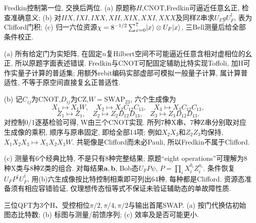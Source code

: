 \begin{exercise}Fredkin控制第一位, 交换后两位. (a) 原题称$H$,CNOT,Fredkin可逼近任意幺正, 检查准确意义; (b) 对$IIX,IXI,IXX,XII,XIX,XXI,XXX$及同样Z串求$U_FgU_F^\dagger$, 表为Clifford门积; (c) 归一六位资源$\chi=8^{-1/2}\sum_{x=0}^7\lvert x\rangle\otimes U_F\lvert x\rangle$, 三Bell测量后给全部条件校正.\end{exercise}
\begin{solution}(a) 所有给定门为实矩阵, 在固定$n$复Hilbert空间不可能逼近任意含相对虚相位的幺正, 所以原题字面表述错误. Fredkin与CNOT可配固定辅助比特实现Toffoli, 加H可作实量子计算的普适集; 用额外rebit编码实部虚部可模拟一般量子计算, 属计算普适性, 不等于原空间直接复幺正普适性.

(b) 记$C_{ij}$为CNOT,$D_{ij}$为CZ,$W=\mathrm{SWAP}_{23}$, 六个生成像为
\[X_1\mapsto X_1W,\quad X_2\mapsto X_2C_{12}C_{13},\quad X_3\mapsto X_3C_{12}C_{13},\]
\[Z_1\mapsto Z_1,\quad Z_2\mapsto Z_2D_{12}D_{13},\quad Z_3\mapsto Z_3D_{12}D_{13}.\]
对控制0/1逐基检验可得, W由三个CNOT实现. 所列7种X串、7种Z串分别取对应生成像的乘积, 顺序与原串固定, 即给全部14项; 例如$X_2X_3$和$Z_2Z_3$均保持, $X_1X_2X_3\mapsto X_1X_2X_3W$. 共轭像是Clifford而未必Pauli, 所以Fredkin不属于Clifford.

(c) 测量有6个经典比特, 不是只有8种完整结果; 原题“eight operations”可理解为8种X类与8种Z类的组合. 对每结果$\mathbf a,\mathbf b$, Bob态$U_FP\psi$, $P=\prod_iX_i^{b_i}Z_i^{a_i}$. 条件恢复$U_FP^\dagger U_F^\dagger$, 用(b)六生成像按比特控制相乘即可列出64种, 每种都是Clifford. 资源态准备须有相应容错验证, 仅理想传态恒等式不保证未验证辅助态的单故障性质.
\end{solution}
\begin{exercise}三位QFT为3个H、受控相位$\pi/2,\pi/4,\pi/2$与输出首尾SWAP. (a) 按门代换估初始图态比特数; (b) 标图与测量/前馈序列; (c) 效率及是否可能更小.\end{exercise}
